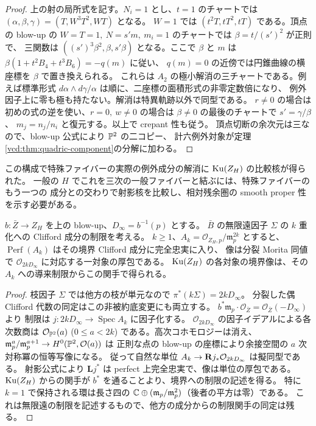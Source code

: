 \begin{proof}
上の射の局所式を記す。$N_i=1$ とし、$t=1$ のチャートでは
$(\alpha,\beta,\gamma)=(T,W^3T^2,WT)$ となる。
$W=1$ では $(t^2T,tT^2,tT)$ である。頂点の blow-up の
$W=T=1,\ N=s'm,\ m_i=1$ のチャートでは $\beta=t/(s')^2$ が正則で、
三関数は $((s')^3\beta^2,\beta,s'\beta)$ となる。ここで $\beta$ と
$m$ は $\beta(1+t^2B_4+t^3B_6)=-q(m)$ に従い、
$q(m)=0$ の近傍では円錐曲線の横座標を $\beta$ で置き換えられる。
これらは $A_2$ の極小解消の三チャートである。例えば標準形式
$d\alpha\wedge d\gamma/\alpha$ は順に、二座標の面積形式の非零定数倍になり、
例外因子上に零も極も持たない。解消は特異軌跡以外で同型である。
$r\ne0$ の場合は初めの式の逆を使い、$r=0,\ w\ne0$ の場合は
$\beta\ne0$ の最後のチャートで $s'=\gamma/\beta$、
$m_j=n_j/n_i$ と復元する。以上で crepant 性も従う。
頂点切断の余次元は三なので、blow-up 公式により $\mathbb P^2$ の二コピー、
計六例外対象が定理\ref{vcd:thm:quadric-component}の分解に加わる。
\end{proof}

この構成で特殊ファイバーの実際の例外成分の解消に $\operatorname{Ku}(Z_H)$ の比較核が得られた。
一般の $H$ でこれを三次の一般ファイバーと結ぶには、特殊ファイバーのもう一つの
成分との交わりで射影核を比較し、相対残余圏の smooth proper 性を示す必要がある。

\begin{corollary}[無限遠への制限が保持する局所環]\label{vcd:cor:jet-boundary}
$b:\bar Z\to Z_H$ を上の blow-up、$D_\infty=b^{-1}(p)$ とする。
$\bar B$ の無限遠因子 $\Sigma$ の $k$ 重化への Clifford 成分の制限を考える。
$k\ge1$、$A_k=\mathcal O_{Z_H,p}/\mathfrak m_p^{2k}$ とすると、
$\operatorname{Perf}(A_k)$ はその境界 Clifford 成分に完全忠実に入り、
像は分裂 Morita 同値で $\mathcal O_{2kD_\infty}$ に対応する一対象の厚包である。
$\operatorname{Ku}(Z_H)$ の各対象の境界像は、その $A_k$ への導来制限からこの関手で得られる。
\end{corollary}
\begin{proof}
枝因子 $\Sigma$ では他方の枝が単元なので $\pi^*(k\Sigma)=2kD_\infty$。
分裂した偶 Clifford 代数の同定はこの非被約底変更にも両立する。
$b^*\mathfrak m_p\cdot\mathcal O_{\bar Z}=\mathcal O_{\bar Z}(-D_\infty)$ より
制限は $j:2kD_\infty\to\operatorname{Spec} A_k$ に因子化する。
$\mathcal O_{2kD_\infty}$ の因子イデアルによる各次数商は
$\mathcal O_{\mathbb P^2}(a)$ ($0\le a<2k$) である。高次コホモロジーは消え、
$\mathfrak m_p^a/\mathfrak m_p^{a+1}\to H^0(\mathbb P^2,\mathcal O(a))$ は
正則な点の blow-up の座標により余接空間の $a$ 次対称冪の恒等写像になる。
従って自然な単位 $A_k\to{\bf R}j_*\mathcal O_{2kD_\infty}$ は擬同型である。
射影公式により $\mathbf L j^*$ は perfect 上完全忠実で、像は単位の厚包である。
$\operatorname{Ku}(Z_H)$ からの関手が $b^*$ を通ることより、境界への制限の記述を得る。
特に $k=1$ で保持される環は長さ四の
$\mathbb C\oplus(\mathfrak m_p/\mathfrak m_p^2)$（後者の平方は零）である。
これは無限遠の制限を記述するもので、他方の成分からの制限関手の同定は残る。
\end{proof}

